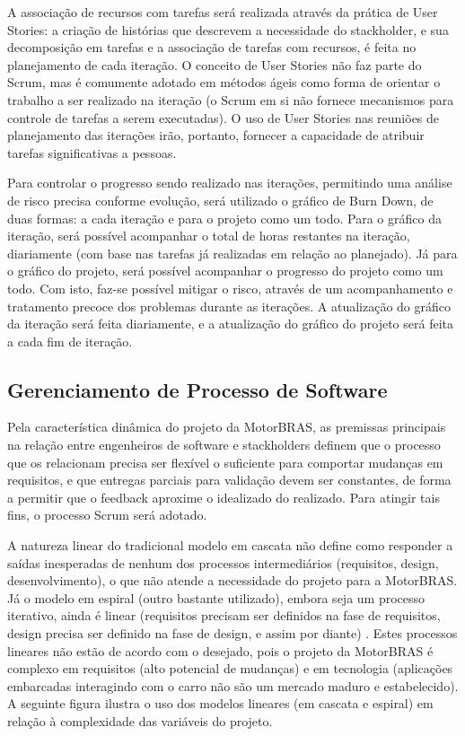\documentclass[12pt,journal,compsoc]{IEEEtran}
\begin{document}
A associação de recursos com tarefas será realizada através da prática de User Stories: a criação de histórias que descrevem a necessidade do stackholder, e sua decomposição em tarefas e a associação de tarefas com recursos, é feita no planejamento de cada iteração. O conceito de User Stories não faz parte do Scrum, mas é comumente adotado em métodos ágeis como forma de orientar o trabalho a ser realizado na iteração \cite{user_stories_applied} (o Scrum em si não fornece mecanismos para controle de tarefas a serem executadas). O uso de User Stories nas reuniões de planejamento das iterações irão, portanto, fornecer a capacidade de atribuir tarefas significativas a pessoas.

Para controlar o progresso sendo realizado nas iterações, permitindo uma análise de risco precisa conforme evolução, será utilizado o gráfico de Burn Down, de duas formas: a cada iteração e para o projeto como um todo. Para o gráfico da iteração, será possível acompanhar o total de horas restantes na iteração, diariamente (com base nas tarefas já realizadas em relação ao planejado). Já para o gráfico do projeto, será possível acompanhar o progresso do projeto como um todo. \cite{understanding_agile_scrum} Com isto, faz-se possível mitigar o risco, através de um acompanhamento e tratamento precoce dos problemas durante as iterações. A atualização do gráfico da iteração será feita diariamente, e a atualização do gráfico do projeto será feita a cada fim de iteração.


\subsection{Gerenciamento de Processo de Software}

Pela característica dinâmica do projeto da MotorBRAS, as premissas principais na relação entre engenheiros de software e stackholders definem que o processo que os relacionam precisa ser flexível o suficiente para comportar mudanças em requisitos, e que entregas parciais para validação devem ser constantes, de forma a permitir que o feedback aproxime o idealizado do realizado. Para atingir tais fins, o processo Scrum será adotado. 

A natureza linear do tradicional modelo em cascata não define como responder a saídas inesperadas de nenhum dos processos intermediários (requisitos, design, desenvolvimento), o que não atende a necessidade do projeto para a MotorBRAS. Já o modelo em espiral (outro bastante utilizado), embora seja um processo iterativo, ainda é linear (requisitos precisam ser definidos na fase de requisitos, design precisa ser definido na fase de design, e assim por diante) \cite{scrum_development_process}. Estes processos lineares não estão de acordo com o desejado, pois o projeto da MotorBRAS é complexo em requisitos (alto potencial de mudanças) e em tecnologia (aplicações embarcadas interagindo com o carro não são um mercado maduro e estabelecido). A seguinte figura ilustra o uso dos modelos lineares (em cascata e espiral) em relação à complexidade das variáveis do projeto. 
\end{document}
